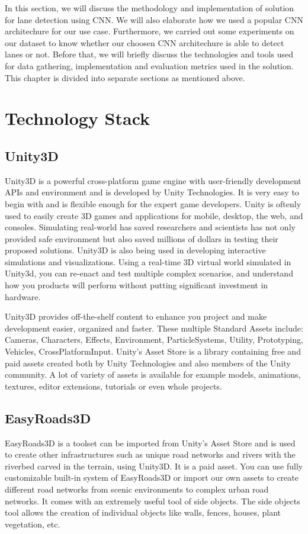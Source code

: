 \par
In this section, we will discuss the methodology and implementation of solution for lane detection using CNN. We will also elaborate how we used a popular CNN architechure for our use case. Furthermore, we carried out some experiments on our dataset to know whether our choosen CNN architechure is able to detect lanes or not. Before that, we will briefly discuss the technologies and tools used for data gathering, implementation and evaluation metrics used in the solution. This chapter is divided into separate sections as mentioned above.

\section{Technology Stack}
\subsection{Unity3D}\label{subsec:unity}
Unity3D is a powerful cross-platform game engine with user-friendly development APIs and environment and is developed by Unity Technologies. It is very easy to begin with and is flexible enough for the expert game developers. Unity is oftenly used to easily create 3D games and applications for mobile, desktop, the web, and consoles. Simulating real-world has saved researchers and scientists has not only provided safe environment but also saved millions of dollars in testing their proposed solutions. Unity3D is also being used in developing interactive simulations and visualizations. Using a real-time 3D virtual world simulated in Unity3d, you can re-enact and test multiple complex scenarios, and understand how you products will perform without putting significant investment in hardware.

\par
Unity3D\cite{unity3d} provides off-the-shelf content to enhance you project and make development easier, organized and faster. These multiple Standard Assets include: Cameras, Characters, Effects, Environment, ParticleSystems, Utility, Prototyping, Vehicles, CrossPlatformInput. Unity’s Asset Store is a library containing free and paid assets created both by Unity Technologies and also members of the Unity community. A lot of variety of assets is available for example models, animations, textures, editor extensions, tutorials or even whole projects.

\subsection{EasyRoads3D}\label{subsec:easyroad3d}
EasyRoads3D\cite{easyroads3d} is a toolset can be imported from Unity's Asset Store and is used to create other infrastructures such as unique road networks and rivers with the riverbed carved in the terrain, using Unity3D. It is a paid asset. You can use fully customizable built-in system of EasyRoads3D or import our own assets to create different road networks from scenic environments to complex urban road networks. It comes with an extremely useful tool of side objects. The side objects tool allows the creation of individual objects like walls, fences, houses, plant vegetation, etc.

